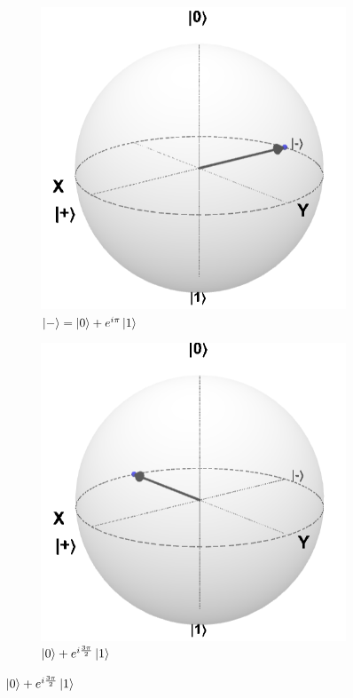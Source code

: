 \documentclass{beamer}
\newcommand{\kz}{\ket{0}}
\newcommand{\ko}{\ket{1}}
\begin{document}
\begin{frame}
\begin{figure}
\begin{subfigure}{0.49\textwidth}
\centering
\includegraphics[scale=0.25]{ket-}
\caption*{$\ket{-} = \kz + e^{i\pi}\ko$}
\end{subfigure}
\begin{subfigure}{0.49\textwidth}
\centering
\includegraphics[scale=0.15]{zero-ione}
\caption*{$\kz + e^{i\frac{3\pi}{2}}\ko$}
\end{subfigure}
\end{figure}

\end{frame}
\end{document}
